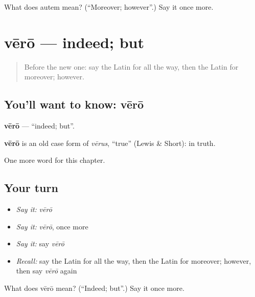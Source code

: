 \begin{tcolorbox}[breakable,colback=teal!4,colframe=teal!35!black,title={Before you move on}]
What does autem mean? (\textquotedblleft{}Moreover; however\textquotedblright{}.) Say it once more.
\end{tcolorbox}
\section[vērō]{vērō — indeed; but}

\label{lesson:LA-C210-vero}



\begin{quote}
Before the new one: say the Latin for all the way, then the Latin for moreover; however.
\end{quote}

\subsection*{You'll want to know: vērō}
\textbf{vērō} — \textquotedblleft{}indeed; but\textquotedblright{}.

\begin{cousinweb}
\textbf{vērō} is an old case form of \emph{vērus}, \textquotedblleft{}true\textquotedblright{} (Lewis \& Short): in truth.
\end{cousinweb}

\begin{grammarlens}[title={What you've built}]
One more word for this chapter.
\end{grammarlens}

\subsection*{Your turn}
\begin{itemize}
\raggedright
  \item \emph{Say it:} \emph{vērō}
  \item \emph{Say it:} \emph{vērō}, once more
  \item \emph{Say it:} say \emph{vērō}
  \item \emph{Recall:} say the Latin for all the way, then the Latin for moreover; however, then say \emph{vērō} again
\end{itemize}

\begin{tcolorbox}[breakable,colback=teal!4,colframe=teal!35!black,title={Before you move on}]
What does vērō mean? (\textquotedblleft{}Indeed; but\textquotedblright{}.) Say it once more.
\end{tcolorbox}
